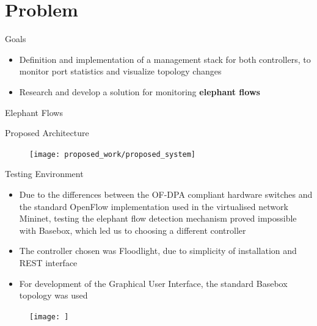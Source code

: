\documentclass{beamer}
\begin{document}
\section{Problem}

\begin{frame}{Goals}
    \begin{itemize}
        \item Definition and implementation of a management stack for both controllers, to monitor port statistics and visualize topology changes
            \pause 
        \item Research and develop a solution for monitoring \textbf{elephant flows}
    \end{itemize}
\end{frame}

\begin{frame}{Elephant Flows}
\end{frame}

\begin{frame}{Proposed Architecture}
        \begin{figure}
            \texttt{[image: proposed\_work/proposed\_system]}
        \end{figure}
\end{frame}

\begin{frame}{Testing Environment}
    \begin{itemize}
        \item Due to the differences between the OF-DPA compliant hardware switches and the standard OpenFlow implementation used in the virtualised 
            network Mininet, testing the elephant flow detection mechanism proved impossible with Basebox, which led us to choosing a different controller
            \pause 
        \item The controller chosen was Floodlight, due to simplicity of installation and REST interface
        \item For development of the Graphical User Interface, the standard Basebox topology was used
    \end{itemize}
    \begin{figure}
        \texttt{[image: ]}
    \end{figure}
\end{frame}
\end{document}
